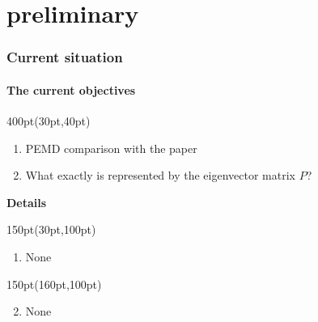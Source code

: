 \section{preliminary}

\begin{frame}
\frametitle{Current situation}
	\framesubtitle{The current objectives}
\footnotesize


\begin{textblock*}{400pt}(30pt,40pt)

\begin{enumerate}
\footnotesize
\item PEMD comparison with the paper
\item What exactly is represented by the eigenvector matrix $P$?
\end{enumerate}
  \vspace{20pt}
  \textbf{Details}
\end{textblock*}


\begin{textblock*}{150pt}(30pt,100pt)
  \begin{enumerate}
  \footnotesize
\item None
  \end{enumerate}

\end{textblock*}


\begin{textblock*}{150pt}(160pt,100pt)

 \begin{enumerate}
  \setcounter{enumi}{1}
 \item None
 \end{enumerate}
\end{textblock*}



\end{frame}
